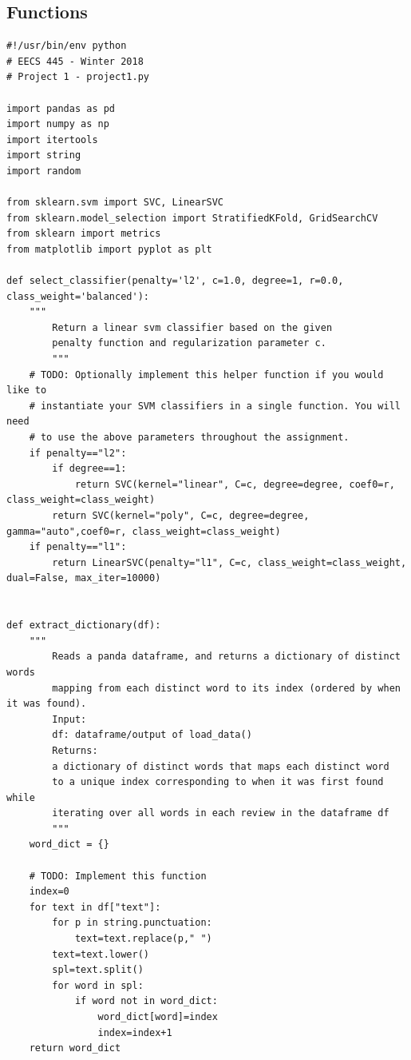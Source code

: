 \documentclass{article}
\begin{document}
\subsection*{Functions}
\begin{lstlisting}
#!/usr/bin/env python
# EECS 445 - Winter 2018
# Project 1 - project1.py

import pandas as pd
import numpy as np
import itertools
import string
import random

from sklearn.svm import SVC, LinearSVC
from sklearn.model_selection import StratifiedKFold, GridSearchCV
from sklearn import metrics
from matplotlib import pyplot as plt

def select_classifier(penalty='l2', c=1.0, degree=1, r=0.0, class_weight='balanced'):
    """
        Return a linear svm classifier based on the given
        penalty function and regularization parameter c.
        """
    # TODO: Optionally implement this helper function if you would like to
    # instantiate your SVM classifiers in a single function. You will need
    # to use the above parameters throughout the assignment.
    if penalty=="l2":
        if degree==1:
            return SVC(kernel="linear", C=c, degree=degree, coef0=r, class_weight=class_weight)
        return SVC(kernel="poly", C=c, degree=degree, gamma="auto",coef0=r, class_weight=class_weight)
    if penalty=="l1":
        return LinearSVC(penalty="l1", C=c, class_weight=class_weight, dual=False, max_iter=10000)


def extract_dictionary(df):
    """
        Reads a panda dataframe, and returns a dictionary of distinct words
        mapping from each distinct word to its index (ordered by when it was found).
        Input:
        df: dataframe/output of load_data()
        Returns:
        a dictionary of distinct words that maps each distinct word
        to a unique index corresponding to when it was first found while
        iterating over all words in each review in the dataframe df
        """
    word_dict = {}

    # TODO: Implement this function
    index=0
    for text in df["text"]:
        for p in string.punctuation:
            text=text.replace(p," ")
        text=text.lower()
        spl=text.split()
        for word in spl:
            if word not in word_dict:
                word_dict[word]=index
                index=index+1
    return word_dict



\end{lstlisting}
\end{document}
